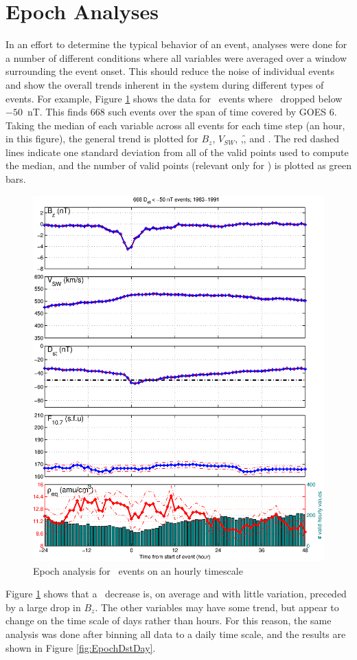 \section{Epoch Analyses}
In an effort to determine the typical behavior of an event, analyses were done for a number of different conditions where all variables were averaged over a window surrounding the event onset. This should reduce the noise of individual events and show the overall trends inherent in the system during different types of events. For example, Figure \ref{fig:EpochDst} shows the data for \dst\ events where \dst\ dropped below $-50$~nT. This finds 668 such events over the span of time covered by GOES 6. Taking the median of each variable across all events for each time step (an hour, in this figure), the general trend is plotted for $B_z$, $V_{SW}$, \dst,\f, and \req. The red dashed lines indicate one standard deviation  from all of the valid points used to compute the median, and the number of valid points (relevant only for \req) is plotted as green bars.

\begin{figure}[htp!]
	\centering
	\includegraphics[width=0.7\linewidth]{Figures/StormAvs/stormavs-dst}
	\caption{Epoch analysis for \dst\ events on an hourly timescale}
	\label{fig:EpochDst}
\end{figure}

Figure \ref{fig:EpochDst} shows that a \dst\ decrease is, on average and with little variation, preceded by a large drop in $B_z$. The other variables may have some trend, but appear to change on the time scale of days rather than hours. For this reason, the same analysis was done after binning all data to a daily time scale, and the results are shown in Figure \ref{fig:EpochDstDay}.

